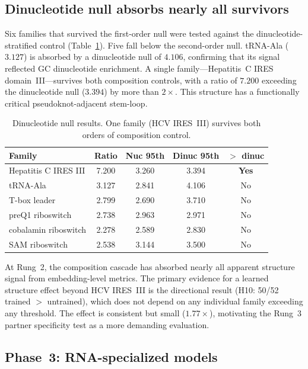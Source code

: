 \documentclass[11pt]{article}
\begin{document}
\subsection{Dinucleotide null absorbs nearly all survivors}
\label{sec:dinuc_results}

Six families that survived the first-order null were tested against
the dinucleotide-stratified control (Table~\ref{tab:dinuc}).  Five
fall below the second-order null.  tRNA-Ala ($3.127$) is absorbed by
a dinucleotide null of $4.106$, confirming that its signal reflected
GC dinucleotide enrichment.  A single family---Hepatitis~C IRES
domain~III---survives both composition controls, with a ratio of
$7.200$ exceeding the dinucleotide null ($3.394$) by more than
$2\times$.  This structure has a functionally critical
pseudoknot-adjacent stem-loop.

\begin{table}[t]
\centering
\caption{Dinucleotide null results.  One family (HCV IRES~III)
  survives both orders of composition control.}
\label{tab:dinuc}
\begin{tabular}{@{}lcccc@{}}
\toprule
\textbf{Family} & \textbf{Ratio} &
  \textbf{Nuc 95th} & \textbf{Dinuc 95th} & \textbf{$>$ dinuc} \\
\midrule
Hepatitis C IRES III & 7.200 & 3.260 & 3.394 & \textbf{Yes} \\
tRNA-Ala          & 3.127 & 2.841 & 4.106 & No \\
T-box leader      & 2.799 & 2.690 & 3.710 & No \\
preQ1 riboswitch  & 2.738 & 2.963 & 2.971 & No \\
cobalamin riboswitch & 2.278 & 2.589 & 2.830 & No \\
SAM riboswitch    & 2.538 & 3.144 & 3.500 & No \\
\bottomrule
\end{tabular}
\end{table}

At Rung~2, the composition cascade has absorbed nearly all apparent
structure signal from embedding-level metrics.  The primary evidence
for a learned structure effect beyond HCV IRES~III is the directional
result (H10: 50/52 trained $>$ untrained), which does not depend on
any individual family exceeding any threshold.  The effect is
consistent but small ($1.77\times$), motivating the Rung~3 partner
specificity test as a more demanding evaluation.

\subsection{Phase~3: RNA-specialized models}
\label{sec:phase3}
\end{document}
